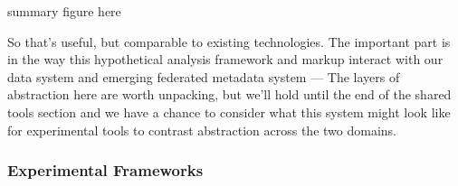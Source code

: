 \documentclass[10pt]{article}
\begin{document}
\begin{multicols}{2}
summary figure here

So that's useful, but comparable to existing technologies. The important
part is in the way this hypothetical analysis framework and markup
interact with our data system and emerging federated metadata system ---
The layers of abstraction here are worth unpacking, but we'll hold until
the end of the shared tools section and we have a chance to consider
what this system might look like for experimental tools to contrast
abstraction across the two domains.


\end{multicols}


\hypertarget{experimental-frameworks}{%
\subsubsection{Experimental Frameworks}\label{experimental-frameworks}}
\end{document}
